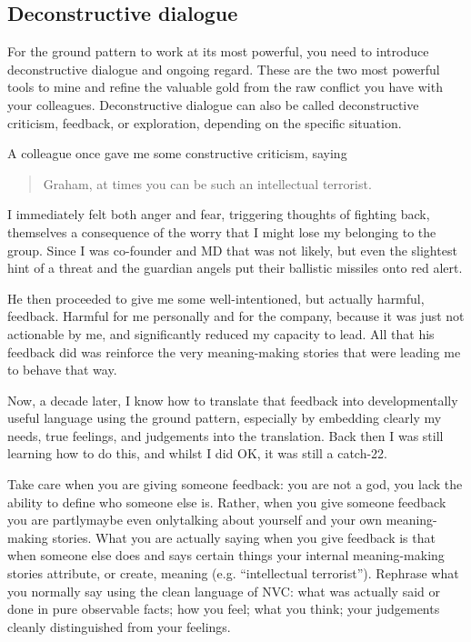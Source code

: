 \subsection{Deconstructive dialogue}
\label{section:deconstructive-criticism} 


For the ground pattern to work at its most powerful, you need to introduce deconstructive dialogue and ongoing regard. These are the two most powerful tools to mine and refine the valuable gold from the raw conflict you have with your colleagues. Deconstructive dialogue can also be called deconstructive criticism, feedback, or exploration, depending on the specific situation.


\begin{longstoryblock}
A colleague once gave me some constructive criticism, saying \begin{quote} Graham, at times you can be such an intellectual terrorist. \end{quote} I immediately felt both anger and fear, triggering thoughts of fighting back, themselves a consequence of the worry that I might lose my belonging to the group. Since I was co-founder and MD that was not likely, but even the slightest hint of a threat and the guardian angels put their ballistic missiles onto red alert. 


He then proceeded to give me some well-intentioned, but actually harmful, feedback. Harmful for me personally and for the company, because it was just not actionable by me, and significantly reduced my capacity to lead. All that his feedback did was reinforce the very meaning\hyp{}making stories that were leading me to behave that way.


Now, a decade later, I know how to translate that feedback into developmentally useful language using the ground pattern, especially by embedding clearly my needs, true feelings, and judgements into the translation. Back then I was still learning how to do this, and whilst I did OK, it was still a catch-22. 
\end{longstoryblock}


Take care when you are giving someone feedback: you are not a god, you lack the ability to define who someone else is. Rather, when you give someone feedback you are partly\textemdash maybe even only\textemdash talking about yourself and your own meaning\hyp{}making stories. What you are actually saying when you give feedback is that when someone else does and says certain things your internal meaning\hyp{}making stories attribute, or create, meaning (e.g. “intellectual terrorist”). Rephrase what you normally say using the clean language of NVC\cite{rosenberg-nonviolent}: what was actually said or done in pure observable facts; how you feel; what you think; your judgements cleanly distinguished from your feelings. 


